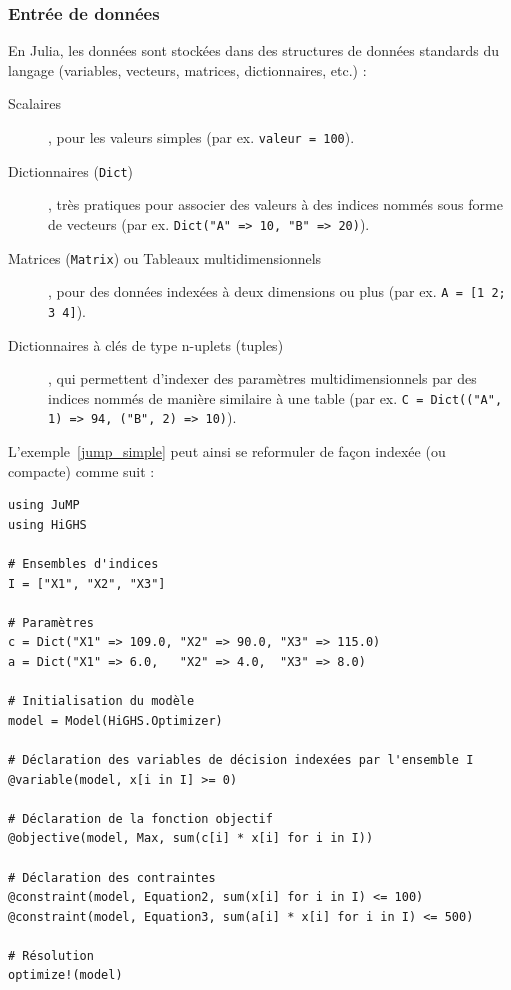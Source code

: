 \subsubsection{Entrée de données}

En Julia, les données sont stockées dans des structures de données standards du langage (variables, vecteurs, matrices, dictionnaires, etc.) :
\begin{description}
\item[Scalaires], pour les valeurs simples (par ex. \verb|valeur = 100|).
\item[Dictionnaires (\texttt{Dict})], très pratiques pour associer des valeurs à des indices nommés sous forme de vecteurs (par ex. \verb|Dict("A" => 10, "B" => 20)|).
\item[Matrices (\texttt{Matrix}) ou Tableaux multidimensionnels], pour des données indexées à deux dimensions ou plus (par ex. \verb|A = [1 2; 3 4]|).
\item[Dictionnaires à clés de type n-uplets (tuples)], qui permettent d'indexer des paramètres multidimensionnels par des indices nommés de manière similaire à une table (par ex. \verb|C = Dict(("A", 1) => 94, ("B", 2) => 10)|).
\end{description}

L'exemple~\ref{jump_simple} peut ainsi se reformuler de façon indexée (ou compacte) comme suit :
\begin{verbatim}
using JuMP
using HiGHS

# Ensembles d'indices
I = ["X1", "X2", "X3"]

# Paramètres
c = Dict("X1" => 109.0, "X2" => 90.0, "X3" => 115.0)
a = Dict("X1" => 6.0,   "X2" => 4.0,  "X3" => 8.0)

# Initialisation du modèle
model = Model(HiGHS.Optimizer)

# Déclaration des variables de décision indexées par l'ensemble I
@variable(model, x[i in I] >= 0)

# Déclaration de la fonction objectif
@objective(model, Max, sum(c[i] * x[i] for i in I))

# Déclaration des contraintes
@constraint(model, Equation2, sum(x[i] for i in I) <= 100)
@constraint(model, Equation3, sum(a[i] * x[i] for i in I) <= 500)

# Résolution
optimize!(model)
\end{verbatim}


